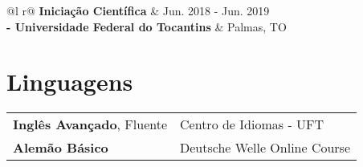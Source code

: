 \documentclass[a4paper,12pt]{article}
\begin{document}
\begin{tabularx}{\linewidth}{ @{}l r@{} }
\textbf{Iniciação Científica} & \hfill Jun. 2018 - Jun. 2019 \\
\textbf{- Universidade Federal do Tocantins}  & \hfill Palmas, TO\\[3.75pt]
\end{tabularx}


\section{Linguagens}
\begin{tabularx}{\linewidth}{@{}l X@{}}
\textbf{Inglês Avançado}, Fluente & \hfill Centro de Idiomas - UFT \\
\textbf{Alemão Básico} & \hfill  Deutsche Welle Online Course \\  
\end{tabularx}



\end{document}
